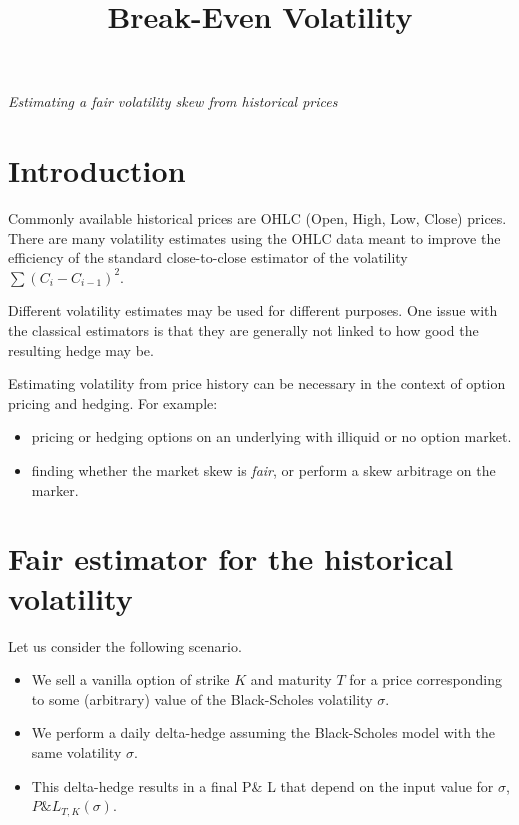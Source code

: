\documentclass[a4paper]{article}
\author
{
}
\title{Break-Even Volatility}
\date{}
\newcommand{\1}{\textbf{1}}
\begin{document}
\maketitle
\vspace{-1cm}

\begin{center}{\Large \emph{Estimating a fair volatility skew from historical prices} }\end{center}

\section{Introduction}

\par Commonly available historical prices are OHLC (Open, High, Low, Close) prices. There are many volatility estimates using the OHLC data meant to improve the efficiency of the standard close-to-close estimator of the volatility $\sum (C_i - C_{i-1})^2$.

\par Different volatility estimates may be used for different purposes. One issue with the classical estimators is that they are generally not linked to how good the resulting hedge may be.

\par Estimating volatility from price history can be necessary in the context of option pricing and hedging. For example:

\begin{itemize}
\item pricing or hedging options on an underlying with illiquid or no option market.

\item finding whether the market skew is \emph{fair}, or perform a skew arbitrage on the marker.
\end{itemize}

\section{Fair estimator for the historical volatility}

Let us consider the following scenario.

\begin{itemize}
\item We sell a vanilla option of strike $K$ and maturity $T$ for a price corresponding to some (arbitrary) value of the Black-Scholes volatility $\sigma$.
\item We perform a daily delta-hedge assuming the Black-Scholes model with the same volatility $\sigma$.
\item This delta-hedge results in a final P\& L that depend on the input value for $\sigma$, $P \text{\&} L_{T, K}(\sigma)$.
\end{itemize}
\end{document}
